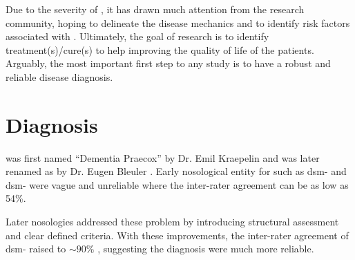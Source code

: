 	
	Due to the severity of , it has drawn much attention from the research community, hoping to delineate the disease mechanics and to identify risk factors associated with .
	Ultimately, the goal of  research is to identify treatment(s)/cure(s) to help improving the quality of life of the patients.
	Arguably, the most important first step to any  study is to have a robust and reliable disease diagnosis.
	
	\section{Diagnosis}
	 was first named ``Dementia Praecox'' by Dr. Emil Kraepelin and was later renamed as  by Dr. Eugen Bleuler \citep{Jablensky2010}.
	Early nosological entity for  such as \gls{dsm}- and \gls{dsm}- were vague and unreliable where the inter-rater agreement can be as low as 54\%. \citep{Tsuang2000,Harvey2012} 
	
	Later nosologies addressed these problem by introducing structural assessment and clear defined criteria. 
	With these improvements, the inter-rater agreement of \gls{dsm}- raised to $\sim 90\%$ \citep{Harvey2012}, suggesting the diagnosis were much more reliable.
	
